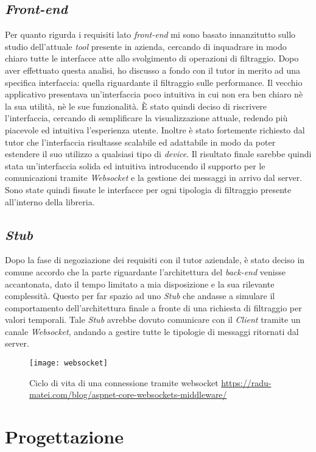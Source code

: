\subsection{\textit{Front-end}}
Per quanto rigurda i requisiti lato \textit{front-end} mi sono basato innanzitutto sullo studio dell'attuale \textit{tool} presente in azienda, cercando di inquadrare in modo chiaro tutte le interfacce atte allo svolgimento di operazioni di filtraggio. Dopo aver effettuato questa analisi, ho discusso a fondo con il tutor in merito ad una specifica interfaccia: quella riguardante il filtraggio sulle performance. Il vecchio applicativo presentava un'interfaccia poco intuitiva in cui non era ben chiaro nè la sua utilità, nè le sue funzionalità. È stato quindi deciso di riscrivere l'interfaccia, cercando di semplificare la visualizzazione attuale, redendo più piacevole ed intuitiva l'esperienza utente. Inoltre è stato fortemente richiesto dal tutor che l'interfaccia risultasse scalabile ed adattabile in modo da poter estendere il suo utilizzo a qualsiasi tipo di \textit{device}. Il risultato finale sarebbe quindi stata un'interfaccia solida ed intuitiva introducendo il supporto per le comunicazioni tramite \textit{\gls{Websocket}} e la gestione dei messaggi in arrivo dal server. Sono state quindi fissate le interfacce per ogni tipologia di filtraggio presente all'interno della libreria.

\subsection{\textit{Stub}}
Dopo la fase di negoziazione dei requisiti con il tutor aziendale, è stato deciso in comune accordo che la parte riguardante l'architettura del \textit{back-end} venisse accantonata, dato il tempo limitato a mia disposizione e la sua rilevante complessità. Questo per far spazio ad uno \textit{Stub} che andasse a simulare il comportamento dell'architettura finale a fronte di una richiesta di filtraggio per valori temporali. Tale \textit{Stub} avrebbe dovuto comunicare con il \textit{Client} tramite un canale \textit{Websocket}, andando a gestire tutte le tipologie di messaggi ritornati dal server.
\begin{figure}[!h] 
	\centering 
	\texttt{[image: websocket]} 
	\caption{Ciclo di vita di una connessione tramite websocket \url{https://radu-matei.com/blog/aspnet-core-websockets-middleware/}}
\end{figure}
\newpage
\section{Progettazione}
